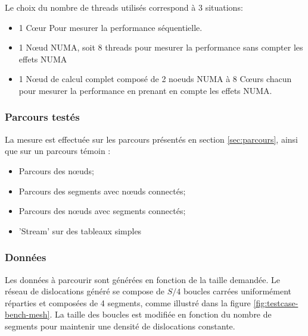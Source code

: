 Le choix du nombre de threads utilisés correspond à 3 situations:
\begin{itemize}
    \item 1 Cœur Pour mesurer la performance séquentielle.
    \item 1 Nœud NUMA, soit 8 threads pour mesurer la performance sans compter les effets NUMA
    \item 1 Nœud de calcul complet composé de 2 noeuds NUMA à 8 Cœurs chacun pour mesurer la performance en prenant en compte les effets NUMA.
\end{itemize}

\subsubsection{Parcours testés}

La mesure est effectuée sur les parcours présentés en section \ref{sec:parcours}, ainsi que sur un parcours témoin :
\begin{itemize}
	\item Parcours des nœuds;
	\item Parcours des segments avec nœuds connectés;
	\item Parcours des nœuds avec segments connectés;
	\item 'Stream' sur des tableaux simples
\end{itemize}

\subsubsection{Données}
\label{sec:bench_mesh_donnees}

Les données à parcourir sont générées en fonction de la taille demandée. Le réseau de dislocations généré se compose de $S/4$ boucles carrées uniformément réparties et composées de 4 segments, comme illustré dans la figure \ref{fig:testcase-bench-mesh}. La taille des boucles est modifiée en fonction du nombre de segments pour maintenir une densité de dislocations constante.

